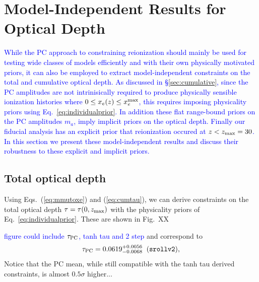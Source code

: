 \documentclass[prd,twocolumn,amsmath,amssymb,floatfix,superscriptaddress,nofootinbib]{revtex4-1}
\newcommand{\beq}{\begin{equation}}
\newcommand{\eeq}{\end{equation}}
\newcommand{\wh}[1]{\textcolor{blue}{#1}}
\begin{document}
\section{Model-Independent Results for Optical Depth}

\wh{
While the PC approach to constraining reionization should mainly be used for 
testing wide classes of models efficiently and with their own physically motivated priors, it can also be employed to extract model-independent constraints on the total and cumulative optical depth.  As discussed in \S \ref{sec:cumulative}, since the PC amplitudes are not intrinisically required
to produce physically sensible ionization histories where $0 \le x_e(z) \le x_e^{\rm max}$, this requires imposing physicality priors using Eq.~\ref{eq:individualprior}.  In addition these flat range-bound priors on the PC amplitudes $m_a$, imply implicit priors on the optical depth.   
Finally our fiducial analysis has an explicit prior that reionization occured
at $z<z_{\rm max}=30$.   In this section we present these model-independent results and discuss their robustness to these explicit and implicit priors.
}





\subsection{Total optical depth}
\label{sec:note_on_priors}


Using Eqs.~(\ref{eq:mmutoxe}) and (\ref{eq:cumtau}), we can derive constraints on the total optical
depth $\tau=\tau(0,z_{\rm max})$ with the physicality priors of Eq.~\ref{eq:individualprior}.  These are shown in Fig.~XX 

\wh{figure could include $\tau_{\rm PC}$, tanh tau and 2 step}
and correspond to
\beq
\tau_{\rm PC} = 0.0619^{+0.0056}_{-0.0068} \;\; (\texttt{srollv2}),
\label{eq:tau_pc_zmax30}
\eeq  
Notice that the PC mean, while still compatible with the tanh 
tau derived constraints, is almost $0.5\sigma$ higher...
\end{document}
